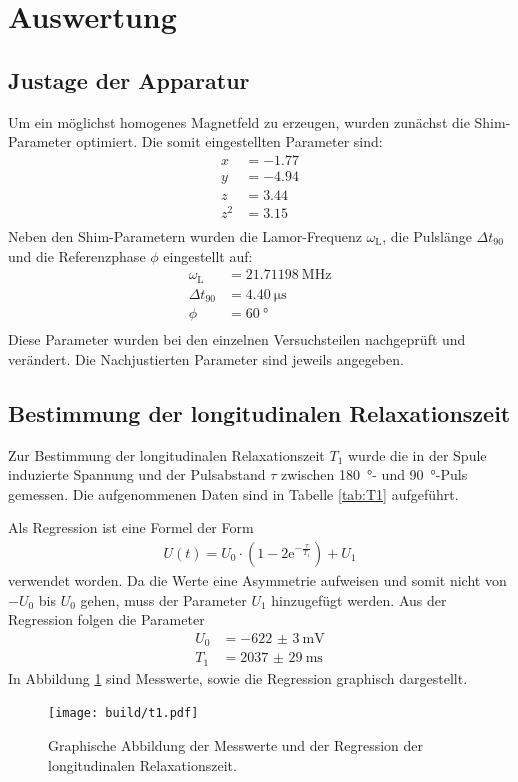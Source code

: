 \newpage
\section{Auswertung}
\label{sec:Auswertung}

\subsection{Justage der Apparatur}
Um ein möglichst homogenes Magnetfeld zu erzeugen, wurden zunächst die
Shim-Parameter optimiert. Die somit eingestellten Parameter sind:
\begin{align*}
  x &= \num{-1.77}  \\
  y &= \num{-4.94}  \\
  z &= \num{+3.44}  \\
  z^2 &= \num{+3.15} \\
\end{align*}
Neben den Shim-Parametern wurden die Lamor-Frequenz $\omega_\text{L}$, die
Pulslänge $\Delta t_\text{90}$ und die Referenzphase $\phi$ eingestellt auf:
\begin{align*}
  \omega_\text{L} &= \SI{21.71198}{\mega\hertz} \\
  \Delta t_\text{90} &= \SI{4.40}{\micro\second} \\
  \phi &= \SI{60}{\degree} \\
\end{align*}
Diese Parameter wurden bei den einzelnen Versuchsteilen nachgeprüft und
verändert. Die Nachjustierten Parameter sind jeweils angegeben.

\subsection{Bestimmung der longitudinalen Relaxationszeit}
Zur Bestimmung der longitudinalen Relaxationszeit $T_1$ wurde die in der
Spule induzierte Spannung und der Pulsabstand $\tau$ zwischen \SI{180}{\degree}-
und \SI{90}{\degree}-Puls gemessen. Die aufgenommenen Daten sind in Tabelle
\ref{tab:T1} aufgeführt.

\FloatBarrier
Als Regression ist eine Formel der Form
\begin{align*}
  U(t) = U_0 \cdot \left(1- 2\text{e}^{-\frac{\tau}{T_1}}\right) + U_1
\end{align*}
verwendet worden. Da die Werte eine Asymmetrie aufweisen und somit nicht von
$-U_0$ bis $U_0$ gehen, muss der Parameter $U_1$ hinzugefügt werden.
Aus der Regression folgen die Parameter
\begin{align*}
  U_0 &= -\SI{622(3)}{\milli\volt} \\
  T_1 &= \SI{2037(29)}{\milli\second}
\end{align*}
In Abbildung \ref{plt:T1} sind Messwerte, sowie die Regression graphisch dargestellt.
\begin{figure}[htb]
  \centering
  \texttt{[image: build/t1.pdf]}
  \caption{Graphische Abbildung der Messwerte und der Regression der longitudinalen Relaxationszeit.}
  \label{plt:T1}
\end{figure}


